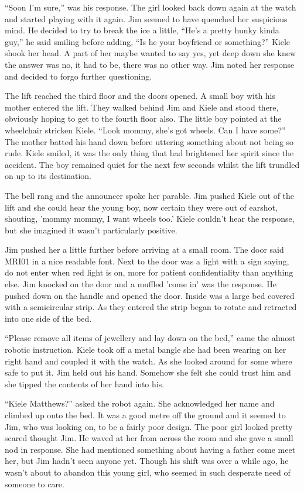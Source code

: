 ``Soon I'm sure,'' was his response.  The girl looked back down again at the watch and started playing with it again.  Jim seemed to have quenched her suspicious mind.  He decided to try to break the ice a little, ``He's a pretty hunky kinda guy,'' he said smiling before adding, ``Is he your boyfriend or something?''  Kiele shook her head.  A part of her maybe wanted to say yes, yet deep down she knew the answer was no, it had to be, there was no other way.  Jim noted her response and decided to forgo further questioning.  

The lift reached the third floor and the doors opened.  A small boy with his mother entered the lift.  They walked behind Jim and Kiele and stood there, obviously hoping to get to the fourth floor also.  The little boy pointed at the wheelchair stricken Kiele.  ``Look mommy, she's got wheels.  Can I have some?''  The mother batted his hand down before uttering something about not being so rude.  Kiele smiled, it was the only thing that had brightened her spirit since the accident.  The boy remained quiet for the next few seconds whilst the lift trundled on up to its destination.

The bell rang and the announcer spoke her parable.  Jim pushed Kiele out of the lift and she could hear the young boy, now certain they were out of earshot, shouting, 'mommy mommy, I want wheels too.'  Kiele couldn't hear the response, but she imagined it wasn't particularly positive.  

Jim pushed her a little further before arriving at a small room.  The door said MRI01 in a nice readable font.  Next to the door was a light with a sign saying, do not enter when red light is on, more for patient confidentiality than anything else.  Jim knocked on the door and a muffled 'come in' was the response.  He pushed down on the handle and opened the door.  Inside was a large bed covered with a semicircular strip.  As they entered the strip began to rotate and retracted into one side of the bed.  

``Please remove all items of jewellery and lay down on the bed,'' came the almost robotic instruction.  Kiele took off a metal bangle she had been wearing on her right hand and coupled it with the watch.  As she looked around for some where safe to put it.  Jim held out his hand.  Somehow she felt she could trust him and she tipped the contents of her hand into his.  

``Kiele Matthews?'' asked the robot again.  She acknowledged her name and climbed up onto the bed.  It was a good metre off the ground and it seemed to Jim, who was looking on, to be a fairly poor design.  The poor girl looked pretty scared thought Jim.  He waved at her from across the room and she gave a small nod in response.  She had mentioned something about having a father come meet her, but Jim hadn't seen anyone yet.  Though his shift was over a while ago, he wasn't about to abandon this young girl, who seemed in such desperate need of someone to care.


